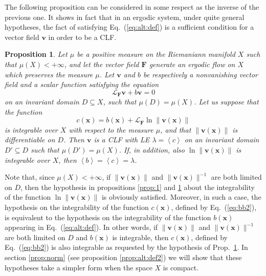 \documentclass{article}
\theoremstyle{plain}
\newtheorem{proposition}[theorem]{Proposition}
\theoremstyle{definition}
\theoremstyle{remark}
\newcommand{\vect}[1]{\boldsymbol{#1}}
\begin{document}
The following proposition can be considered in some respect as the
inverse of the previous one. It shows in fact
that in an ergodic system, under quite
general hypotheses, the fact of satisfying Eq.~(\ref{eq:alt:def}) is a
sufficient condition for a vector field $\vect{v}$ in order to be a
CLF.

\begin{proposition}
  \label{prop:alt:def}
Let $\mu$ be a positive measure on the Riemaniann manifold $X$ such
that $\mu(X)<+\infty$, and let the vector field $\vect{F}$ generate an
ergodic flow on $X$ which preserves the measure $\mu$.  Let $\vect{v}$
and $b$ be respectively a nonvanishing vector field and a scalar
function satisfying the equation
\[
 \mathcal{L}_{\vect{F}} \vect{v} + b \vect v = 0 
\]
on an invariant domain \mbox{$D\subseteq X$}, such that
$\mu(D)=\mu(X)$. Let us suppose that the function
\begin{equation}\label{eq:bb2}
c(\vect{x})=b(\vect{x})+\mathcal{L}_{\vect{F}}
\ln \lVert \vect{v}\left(\vect {x}\right) \rVert 
\end{equation}
is integrable over $X$ with respect to the measure $\mu$, and
that $\lVert \vect{v}\left(\vect {x}\right) \rVert$ is differentiable
on $D$. Then $\vect{v}$ is a CLF with LE $\lambda=\left<c\right>$ on
an invariant domain $D'\subseteq D$ such that $\mu(D')=\mu(X)$. If, in
addition, also $\ln \lVert \vect{v}\left(\vect {x}\right) \rVert$ is
integrable over $X$, then $\left<b\right>=\left<c\right>=\lambda$.
\end{proposition}
Note that, since $\mu(X)<+\infty$, if $\lVert
\vect{v}(\vect{x})\rVert$ and $\lVert \vect{v}(\vect{x})\rVert^{-1}$
are both limited on $D$, then the hypothesis in propositions
\ref{prop:1} and \ref{prop:alt:def} about the integrability of the
function $\ln \lVert \vect{v}\left(\vect {x}\right) \rVert$ is
obviously satisfied.  Moreover, in such a case, the
  hypothesis on the integrability of the function $c\left(\vect {x}\right)$, 
defined by  Eq.~(\ref{eq:bb2}), is equivalent to the hypothesis on the
  integrability of the function $b\left(\vect {x}\right)$ appearing in
  Eq.~(\ref{eq:alt:def}).  In other words, if $\lVert
  \vect{v}(\vect{x})\rVert$ and $\lVert \vect{v}(\vect{x})\rVert^{-1}$
  are both limited on $D$ and $b\left(\vect {x}\right)$ is integrable, 
then $c\left(\vect {x}\right)$, defined by
  Eq.~(\ref{eq:bb2}) is also integrable as requested by the hypothesis
  of Prop.~\ref{prop:alt:def}. In section \ref{prop:norm}
(see proposition \ref{prop:alt:def2}) we will show that
these hypotheses take a simpler form when the space $X$ is compact.
\end{document}

